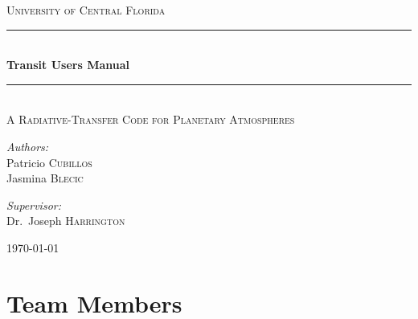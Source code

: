 \documentclass[letterpaper, 12pt]{article}
\begin{document}

\begin{titlepage}
\begin{center}

\textsc{\LARGE University of Central Florida}\\[1.5cm]

\rule{\linewidth}{0.5mm} \\[0.4cm]
{ \huge \bfseries Transit Users Manual \\[0.4cm] }
\rule{\linewidth}{0.5mm} \\[1.0cm]

\textsc{\Large A Radiative-Transfer Code for Planetary Atmospheres}\\[1.5cm]

\noindent
\begin{minipage}{0.4\textwidth}
\begin{flushleft} \large
\emph{Authors:}\\
Patricio \textsc{Cubillos}\\
Jasmina  \textsc{Blecic}  \\
\end{flushleft}
\end{minipage}%
\begin{minipage}{0.4\textwidth}
\begin{flushright} \large
\emph{Supervisor:} \\
Dr.~Joseph \textsc{Harrington}
\end{flushright}
\end{minipage}

\vfill

{\large \today}

\end{center}
\end{titlepage}

\tableofcontents

\newpage

\section{Team Members}
\label{sec:team}
\end{document}
